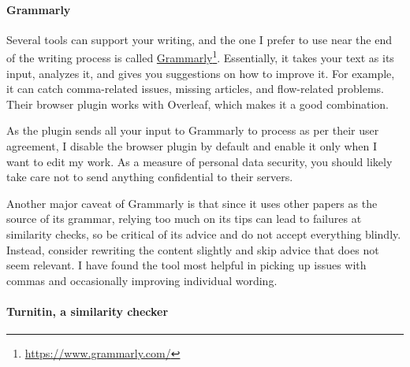 

\paragraph{Grammarly}

Several tools can support your writing, and the one I prefer to use near the end of the writing process is called \href{https://www.grammarly.com/}{Grammarly}\footnote{\url{https://www.grammarly.com/}}.
Essentially, it takes your text as its input, analyzes it, and gives you suggestions on how to improve it.
For example, it can catch comma-related issues, missing articles, and flow-related problems.
Their browser plugin works with Overleaf, which makes it a good combination.

As the plugin sends all your input to Grammarly to process as per their user agreement, I disable the browser plugin by default and enable it only when I want to edit my work.
As a measure of personal data security, you should likely take care not to send anything confidential to their servers.

Another major caveat of Grammarly is that since it uses other papers as the source of its grammar, relying too much on its tips can lead to failures at similarity checks, so be critical of its advice and do not accept everything blindly.
Instead, consider rewriting the content slightly and skip advice that does not seem relevant.
I have found the tool most helpful in picking up issues with commas and occasionally improving individual wording.

\paragraph{Turnitin, a similarity checker}

